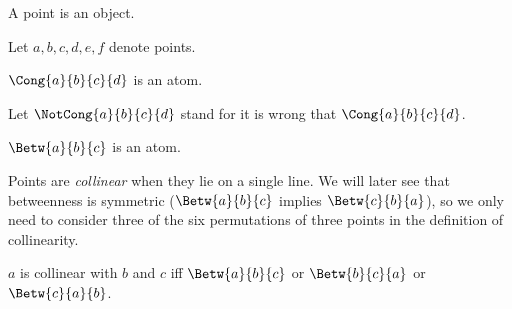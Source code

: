 \documentclass[10pt,a4paper,parskip=half,numbers=endperiod,parskip]{scrartcl}
\begin{document}
\begin{comment}
  \begin{forthel}
    [synonym point/-s]
  \end{forthel}
\end{comment}

  \begin{forthel}
    \begin{signature}
      A point is an object.
    \end{signature}
  \end{forthel}

  \begin{convention}
    \begin{forthel}
      Let $a, b, c, d, e, f$ denote points.
    \end{forthel}
  \end{convention}

  \begin{forthel}
    \begin{signature}[Congruence]
      $\Cong{a}{b}{c}{d}$ is an atom.
    \end{signature}
  \end{forthel}

  \begin{convention}
    \begin{forthel}
      Let $\NotCong{a}{b}{c}{d}$ stand for it is wrong that $\Cong{a}{b}{c}{d}$.
    \end{forthel}
  \end{convention}

  \begin{forthel}
    \begin{signature}[Betweenness]
      $\Betw{a}{b}{c}$ is an atom.
    \end{signature}
  \end{forthel}

  Points are \textit{collinear} when they lie on a single line.
  We will later see that betweenness is symmetric
  ($\Betw{a}{b}{c}$ implies $\Betw{c}{b}{a}$),
  so we only need to consider three of the six permutations of three points in the definition of collinearity.

  \begin{forthel}
    \begin{definition}[Collinearity]
      $a$ is collinear with $b$ and $c$ iff $\Betw{a}{b}{c}$ or $\Betw{b}{c}{a}$ or $\Betw{c}{a}{b}$.
    \end{definition}
  \end{forthel}
\end{document}
